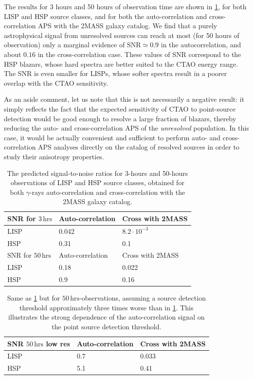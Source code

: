 The results for 3 hours and 50 hours of observation time are shown in \cref{table:SNR}, for both LISP and HSP source classes, and for both the auto-correlation and cross-correlation APS with the 2MASS galaxy catalog. We find that a purely astrophysical signal from unresolved sources can reach at most (for 50 hours of observation) only a marginal evidence of $\textrm{SNR} \simeq 0.9$ in the autocorrelation, and about $0.16$ in the cross-correlation case.   
These values of SNR correspond to the HSP blazars, whose hard spectra are better suited to the CTAO energy range. The SNR is even smaller for LISPs, whose softer spectra result in a poorer overlap with the CTAO sensitivity. 

As an aside comment, let us note that this is not necessarily a negative result: it simply reflects the fact that the expected sensitivity of CTAO to point-source detection would be good enough to resolve a large fraction of blazars, thereby reducing the auto- and cross-correlation APS of the \textsl{unresolved} population. In this case, it would be actually convenient and sufficient to perform auto- and cross-correlation APS analyses directly on the catalog of resolved sources in order to study their anisotropy properties. 

\begin{table}[t!]
\centering
\begin{tabular}{m{}  m{}  m{}} 
 \hline
 SNR for $3\,\textrm{hrs}$ & Auto-correlation & Cross with 2MASS \\ [0.5ex]
 \hline
 LISP &  0.042 &   $8.2\cdot 10^{-3}$ \\ [0.5ex]
 HSP &  0.31 &  0.1 \\  [1.5ex]
 \hline \hline
  SNR for $50\,\textrm{hrs}$ & Auto-correlation & Cross with 2MASS \\ [0.5ex]
 \hline
 LISP &  0.18 &  0.022 \\ [0.5ex]
 HSP &  0.9 &  0.16\\ [1ex]
 \hline
\end{tabular}
\caption{The predicted signal-to-noise ratios for 3-hours and 50-hours observations of LISP and HSP source classes, obtained for both $\gamma$-rays auto-correlation and cross-correlation with the 2MASS galaxy catalog. 
}
\label{table:SNR}
\end{table}

\begin{table}[t!]
\centering
\begin{tabular}{m{} m{} m{}} 
\hline
 SNR $50\,\textrm{hrs}$ low res & Auto-correlation & Cross with 2MASS 
 \\ [0.5ex]
 \hline
 LISP &  0.7 &   0.033 \\ [0.5ex]
 HSP &  5.1 &  0.41 \\  [1ex]
 \hline
\end{tabular}
\caption{Same as \cref{table:SNR} but for $50\,\textrm{hrs}$-observations, assuming a source detection threshold approximately three times worse than in \cref{table:SNR}. This illustrates the strong dependence of the auto-correlation signal on the point source detection threshold.}
\label{table:SNR-mix}
\end{table}

